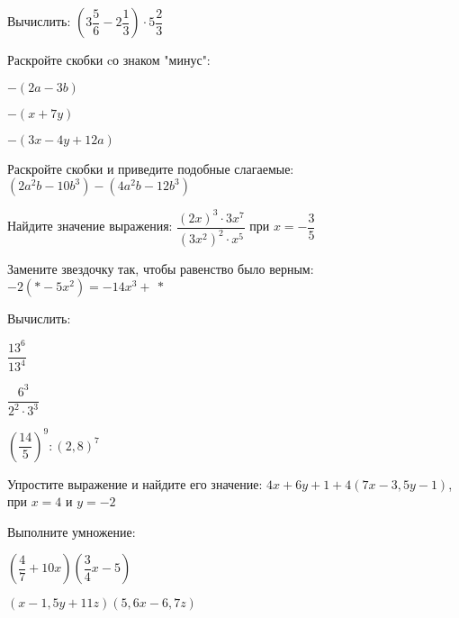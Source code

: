 \begin{class}[number=7]
	\begin{listofex}
		\item Вычислить: \( \left( 3\dfrac{5}{6}-2\dfrac{1}{3} \right)\cdot5\dfrac{2}{3} \)
		\item Раскройте скобки cо знаком "минус":
		\begin{enumcols}[itemcolumns=3]
			\item \( -(2a-3b) \)
			\item \( -(x+7y) \)
			\item \( -(3x-4y+12a) \)
		\end{enumcols}
		\item Раскройте скобки и приведите подобные слагаемые:\quad\( (2a^2b-10b^3)-(4a^2b-12b^3) \)
		\item Найдите значение выражения: \( \dfrac{(2x)^3\cdot3x^7}{(3x^2)^2\cdot x^5} \) при \( x=-\dfrac{3}{5} \)
		\item Замените звездочку так, чтобы равенство было верным: \( -2(*-5x^2)=-14x^3+\:* \)
		\item Вычислить:
		\begin{enumcols}[itemcolumns=3]
			\item \( \dfrac{13^6}{13^4} \)
			\item \( \dfrac{6^3}{2^2\cdot3^3} \)
			\item \( \left( \dfrac{14}{5} \right)^{9}:\left( 2,8 \right)^{7} \)
		\end{enumcols}
		\item Упростите выражение и найдите его значение: \( 4x+6y+1+4(7x-3,5y-1) \), при \( x=4 \) и \( y=-2 \)
		\item Выполните умножение:
		\begin{enumcols}[itemcolumns=2]
			\item \( \left(\dfrac{4}{7}+10x\right) \left( \dfrac{3}{4}x-5 \right) \)
			\item \( (x-1,5y+11z)(5,6x-6,7z) \)
		\end{enumcols}
	\end{listofex}
\end{class}
%
%
